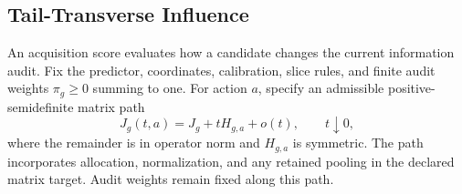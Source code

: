 \subsection{Tail-Transverse Influence}
\label{app:tail-transverse-influence}
\label{sec:targeted-interventions}

An acquisition score evaluates how a candidate changes the current information audit. Fix the predictor, coordinates, calibration, slice rules, and finite audit weights $\pi_g\ge0$ summing to one. For action $a$, specify an admissible positive-semidefinite matrix path
\begin{equation}
J_g(t,a)=J_g+tH_{g,a}+o(t),\qquad t\downarrow0,
\label{eq:influence-matrix-path}
\end{equation}
where the remainder is in operator norm and $H_{g,a}$ is symmetric. The path incorporates allocation, normalization, and any retained pooling in the declared matrix target. Audit weights remain fixed along this path.

